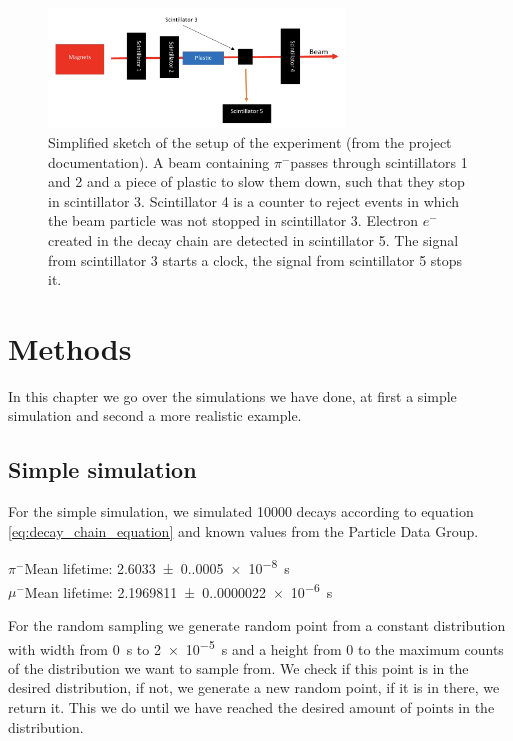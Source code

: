 \documentclass[11pt, a4paper, oneside]{book}
\newcommand{\electron}{$e^{-}$}
\newcommand{\pion}{$\pi^{-}$}
\newcommand{\muon}{$\mu^{-}$}
\begin{document}
\begin{figure}[h]
\begin{center}
\includegraphics[width=0.7\textwidth]{images/experimental_setup.png}
\end{center}
\caption{Simplified sketch of the setup of the experiment (from the project documentation). A beam containing \pion passes through scintillators 1 and 2 and a piece of plastic to slow them down, such that they stop in scintillator 3. Scintillator 4 is a counter to reject events in which the beam particle was not stopped in scintillator 3. Electron \electron created in the decay chain are detected in scintillator 5. The signal from scintillator 3 starts a clock, the signal from scintillator 5 stops it.}
\label{fig:experimental_setup}
\end{figure}


\FloatBarrier
\chapter{Methods}

In this chapter we go over the simulations we have done, at first a simple simulation and second a more realistic example.

\section{Simple simulation} \label{sec:simple_simulation}

For the simple simulation, we simulated \num{10000} decays according to equation \ref{eq:decay_chain_equation} and known values from the Particle Data Group. \cite{ParticleDataGroup:2024cfk}

\pion Mean lifetime: \qty{2.6033(0.0005)e-8}{\s} \\
\muon Mean lifetime: \qty{2.1969811(0.0000022)e-6}{\s}

For the random sampling we generate random point from a constant distribution with width from \qty{0}{\s} to \qty{2e-5}{\s} and a height from 0 to the maximum counts of the distribution we want to sample from. We check if this point is in the desired distribution, if not, we generate a new random point, if it is in there, we return it. This we do until we have reached the desired amount of points in the distribution.
\end{document}
